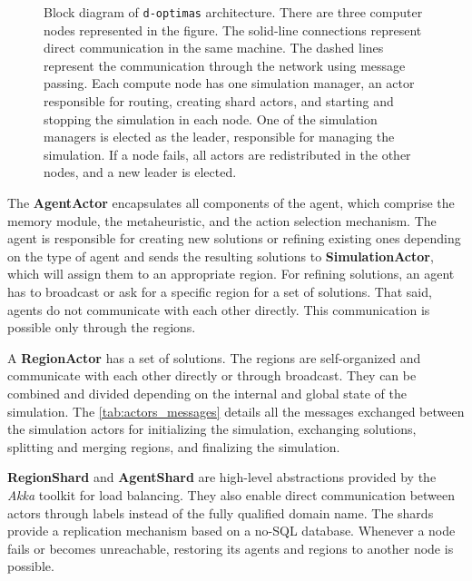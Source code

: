 \documentclass[preprint,12pt]{elsarticle}
\begin{document}
\begin{figure}[ht!]
    \centering
    
    \caption{Block diagram of \texttt{d-optimas} architecture. There are three computer nodes represented in the figure. The solid-line connections represent direct communication in the same machine. The dashed lines represent the communication through the network using message passing.  Each compute node has one simulation manager, an actor responsible for routing, creating shard actors, and starting and stopping the simulation in each node. One of the simulation managers is elected as the leader, responsible for managing the simulation. If a node fails, all actors are redistributed in the other nodes, and a new leader is elected.}
    \label{fig:d-optimas-new}
\end{figure}

The \textbf{AgentActor} encapsulates all components of the agent, which comprise the memory module, the metaheuristic, and the action selection mechanism. The agent is responsible for creating new solutions or refining existing ones depending on the type of agent and sends the resulting solutions to \textbf{SimulationActor}, which will assign them to an appropriate region. For refining solutions, an agent has to broadcast or ask for a specific region for a set of solutions. That said, agents do not communicate with each other directly. This communication is possible only through the regions. 

A \textbf{RegionActor} has a set of solutions. The regions are self-organized and communicate with each other directly or through broadcast. They can be combined and divided depending on the internal and global state of the simulation. The \autoref{tab:actors_messages} details all the messages exchanged between the simulation actors for initializing the simulation, exchanging solutions, splitting and merging regions, and finalizing the simulation.

 \textbf{RegionShard} and \textbf{AgentShard} are high-level abstractions provided by the \textit{Akka} toolkit for load balancing. They also enable direct communication between actors through labels instead of the fully qualified domain name. The shards provide a replication mechanism based on a no-SQL database. Whenever a node fails or becomes unreachable, restoring its agents and regions to another node is possible. 
\end{document}
